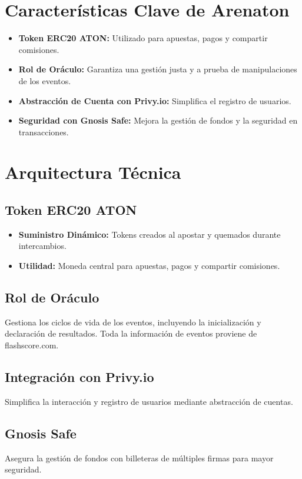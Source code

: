 \documentclass[11pt,twocolumn]{article}
\begin{document}
\section{Características Clave de Arenaton}
\begin{itemize}[itemsep=0.5em]
    \item \textbf{Token ERC20 ATON:} Utilizado para apuestas, pagos y compartir comisiones.
    \item \textbf{Rol de Oráculo:} Garantiza una gestión justa y a prueba de manipulaciones de los eventos.
    \item \textbf{Abstracción de Cuenta con Privy.io:} Simplifica el registro de usuarios.
    \item \textbf{Seguridad con Gnosis Safe:} Mejora la gestión de fondos y la seguridad en transacciones.
\end{itemize}

\section{Arquitectura Técnica}
\subsection{Token ERC20 ATON}
\begin{itemize}[itemsep=0.5em]
    \item \textbf{Suministro Dinámico:} Tokens creados al apostar y quemados durante intercambios.
    \item \textbf{Utilidad:} Moneda central para apuestas, pagos y compartir comisiones.
\end{itemize}

\subsection{Rol de Oráculo}
Gestiona los ciclos de vida de los eventos, incluyendo la inicialización y declaración de resultados. Toda la información de eventos proviene de flashscore.com.

\subsection{Integración con Privy.io}
Simplifica la interacción y registro de usuarios mediante abstracción de cuentas.

\subsection{Gnosis Safe}
Asegura la gestión de fondos con billeteras de múltiples firmas para mayor seguridad.
\end{document}
